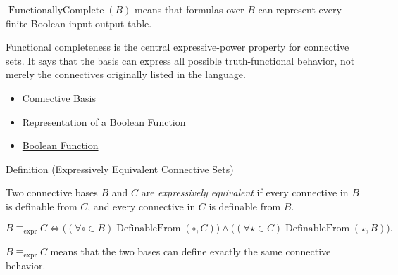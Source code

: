 \begin{remark*}
\(\operatorname{FunctionallyComplete}(B)\) means that formulas over \(B\) can
represent every finite Boolean input-output table.
\end{remark*}

\begin{remark*}[Interpretation]
Functional completeness is the central expressive-power property for connective
sets. It says that the basis can express all possible truth-functional behavior,
not merely the connectives originally listed in the language.
\end{remark*}

\begin{dependencies}
\begin{itemize}
  \item \hyperref[def:connective-basis-propositional-logic]{Connective Basis}
  \item \hyperref[def:boolean-function-representation-propositional-logic]{Representation of a Boolean Function}
  \item \hyperref[def:boolean-function-propositional-logic]{Boolean Function}
\end{itemize}
\end{dependencies}

\begin{definitionbox}{Definition (Expressively Equivalent Connective Sets)}
\begin{definition}
\label{def:expressively-equivalent-connective-sets-propositional-logic}
Two connective bases \(B\) and \(C\) are \emph{expressively equivalent} if every
connective in \(B\) is definable from \(C\), and every connective in \(C\) is
definable from \(B\).
\end{definition}
\end{definitionbox}

\begin{remark*}
\[
B\equiv_{\mathrm{expr}} C
\Longleftrightarrow
\bigl((\forall\circ\in B)\operatorname{DefinableFrom}(\circ,C)\bigr)
\land
\bigl((\forall\star\in C)\operatorname{DefinableFrom}(\star,B)\bigr).
\]
\end{remark*}

\begin{remark*}
\(B\equiv_{\mathrm{expr}} C\) means that the two bases can define exactly the
same connective behavior.
\end{remark*}

